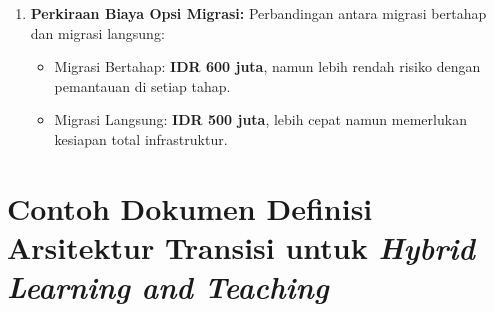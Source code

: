 \begin{enumerate}
	\item \textbf{Perkiraan Biaya Opsi Migrasi:} 
	Perbandingan antara migrasi bertahap dan migrasi langsung:
	\begin{itemize}
		\item Migrasi Bertahap: \textbf{IDR 600 juta}, namun lebih rendah risiko dengan pemantauan di setiap tahap.
		\item Migrasi Langsung: \textbf{IDR 500 juta}, lebih cepat namun memerlukan kesiapan total infrastruktur.
	\end{itemize}
\end{enumerate}

\section{Contoh Dokumen Definisi Arsitektur Transisi untuk \textit{Hybrid Learning and Teaching} }
\label{sec:contoh_dokumen_definisi_arsitektur_transisi}

